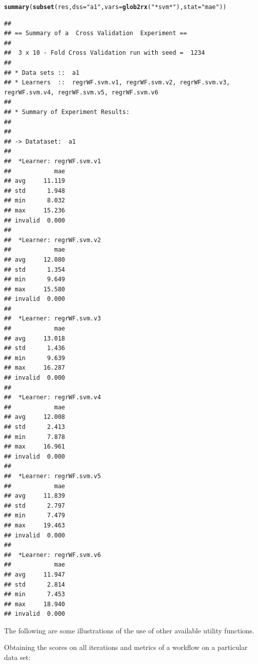 \documentclass[10pt,a4paper]{article}\usepackage[]{graphicx}\usepackage[]{color}
\makeatletter
\newcommand{\hlstr}[1]{\textcolor[rgb]{0.192,0.494,0.8}{#1}}%
\newcommand{\hlstd}[1]{\textcolor[rgb]{0.345,0.345,0.345}{#1}}%
\newcommand{\hlkwc}[1]{\textcolor[rgb]{0.333,0.667,0.333}{#1}}%
\newcommand{\hlkwd}[1]{\textcolor[rgb]{0.737,0.353,0.396}{\textbf{#1}}}%
\newenvironment{kframe}{%
 \def\at@end@of@kframe{}%
 \ifinner\ifhmode%
  \def\at@end@of@kframe{\end{minipage}}%
  \begin{minipage}{\columnwidth}%
 \fi\fi%
 \def\FrameCommand##1{\hskip\@totalleftmargin \hskip-\fboxsep
 \colorbox{shadecolor}{##1}\hskip-\fboxsep
     \hskip-\linewidth \hskip-\@totalleftmargin \hskip\columnwidth}%
 \MakeFramed {\advance\hsize-\width
   \@totalleftmargin\z@ \linewidth\hsize
   \@setminipage}}%
 {\par\unskip\endMakeFramed%
 \at@end@of@kframe}
\newenvironment{knitrout}{}{} %
\makeatother
\begin{document}
\begin{knitrout}
\color{fgcolor}\begin{kframe}
\begin{alltt}
\hlkwd{summary}\hlstd{(}\hlkwd{subset}\hlstd{(res,} \hlkwc{dss} \hlstd{=} \hlstr{"a1"}\hlstd{,} \hlkwc{vars} \hlstd{=} \hlkwd{glob2rx}\hlstd{(}\hlstr{"*svm*"}\hlstd{),} \hlkwc{stat} \hlstd{=} \hlstr{"mae"}\hlstd{))}
\end{alltt}
\begin{verbatim}
## 
## == Summary of a  Cross Validation  Experiment ==
## 
##  3 x 10 - Fold Cross Validation run with seed =  1234 
## 
## * Data sets ::  a1
## * Learners  ::  regrWF.svm.v1, regrWF.svm.v2, regrWF.svm.v3, regrWF.svm.v4, regrWF.svm.v5, regrWF.svm.v6
## 
## * Summary of Experiment Results:
## 
## 
## -> Datataset:  a1 
## 
## 	*Learner: regrWF.svm.v1 
##            mae
## avg     11.119
## std      1.948
## min      8.032
## max     15.236
## invalid  0.000
## 
## 	*Learner: regrWF.svm.v2 
##            mae
## avg     12.080
## std      1.354
## min      9.649
## max     15.580
## invalid  0.000
## 
## 	*Learner: regrWF.svm.v3 
##            mae
## avg     13.018
## std      1.436
## min      9.639
## max     16.287
## invalid  0.000
## 
## 	*Learner: regrWF.svm.v4 
##            mae
## avg     12.008
## std      2.413
## min      7.878
## max     16.961
## invalid  0.000
## 
## 	*Learner: regrWF.svm.v5 
##            mae
## avg     11.839
## std      2.797
## min      7.479
## max     19.463
## invalid  0.000
## 
## 	*Learner: regrWF.svm.v6 
##            mae
## avg     11.947
## std      2.814
## min      7.453
## max     18.940
## invalid  0.000
\end{verbatim}
\end{kframe}
\end{knitrout}



The following are some illustrations of the use of other available
utility functions.

Obtaining the scores on all iterations and metrics of a workflow on a
particular data set:
\end{document}
